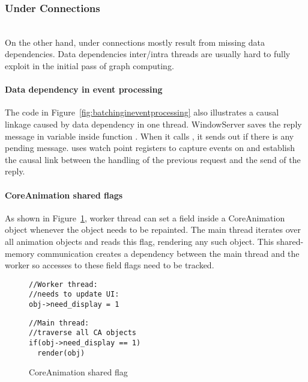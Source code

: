 \subsubsection{Under Connections}\hfill\\
On the other hand, under connections mostly result from missing data
dependencies. Data dependencies inter/intra threads are usually hard to fully
exploit in the initial pass of graph computing.

\paragraph{Data dependency in event processing}
The code in Figure~\ref{fig:batchingineventprocessing} also illustrates a causal linkage caused by data dependency in one thread.
WindowServer saves the reply message in
variable  inside function . When it calls
, it sends out  if there is any pending
message. \xxx uses watch point registers to capture events on  and
establish the causal link between the handling of the previous request and the
send of the reply.

\paragraph{CoreAnimation shared flags}
As shown in Figure~\ref{fig:casharedflag}, worker thread can set
a field  inside a CoreAnimation
object whenever the object needs to be repainted. The main thread iterates over
all animation objects and reads this flag, rendering any such object. This
shared-memory communication creates a dependency between the main thread and the
worker so accesses to these field flags need to be tracked.

\begin{figure}[ht!]
\begin{minipage}[t]{.18\textwidth}
\begin{lstlisting}
//Worker thread:
//needs to update UI:
obj->need_display = 1
\end{lstlisting}\hfill
\end{minipage}
\noindent\begin{minipage}[t]{.28\textwidth}
\begin{lstlisting}
//Main thread: 
//traverse all CA objects
if(obj->need_display == 1)
  render(obj)
\end{lstlisting}\hfill
\end{minipage}
    \caption{CoreAnimation shared flag}
    \label{fig:casharedflag}
\end{figure}

